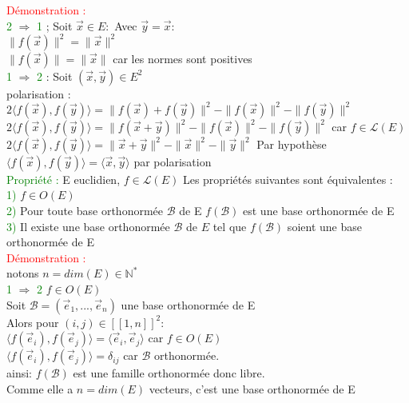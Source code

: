 \documentclass{article}
\begin{document}
\textcolor{red}{Démonstration :} \\
\textcolor{green}{2} $\Rightarrow$ \textcolor{green}{1} ; Soit $\vec x \in E :$ Avec $\vec y=\vec x :$ \\
$\| f(\vec x) \|^2=\|\vec x \|^2$ \\
$\| f(\vec x) \|=\| \vec x \|$ car les normes sont positives \\
\textcolor{green}{1} $\Rightarrow$ \textcolor{green}{2} : Soit $(\vec x, \vec y) \in E^2$ \\
polarisation : \\
$2 \langle f(\vec x), f(\vec y) \rangle = \| f(\vec x) + f(\vec y) \|^2- \| f(\vec x) \|^2 - \|f(\vec y) \|^2$ \\
$2 \langle f(\vec x), f(\vec y) \rangle =\| f(\vec x + \vec y) \|^2- \| f(\vec x) \|^2 - \|f(\vec y) \|^2$ car $f\in \mathcal L(E)$ \\
$2\langle f(\vec x),f(\vec y) \rangle = \| \vec x+ \vec y \|^2- \| \vec x \|^2 - \|\vec y \|^2$ Par hypothèse \\
 $\langle f(\vec x),f(\vec y) \rangle = \langle \vec x, \vec y \rangle$ par polarisation\\
\textcolor{green}{Propriété :} E euclidien, $f\in \mathcal L(E)$ Les propriétés suivantes sont équivalentes : \\
\textcolor{green}{1)} $f\in O(E)$ \\
\textcolor{green}{2)} Pour toute base orthonormée $\mathcal B$ de E $f(\mathcal B)$ est une base orthonormée de E \\
\textcolor{green}{3)} Il existe une base orthonormée $\mathcal B$ de $E$ tel que $f(\mathcal B)$ soient une base orthonormée de E \\
\textcolor{red}{Démonstration :} \\
notons $n=dim(E) \in \mathbb N^*$ \\
\textcolor{green}{1} $\Rightarrow$ \textcolor{green}{2} $f \in O(E)$ \\
Soit $\mathcal B=(\vec e_1,...,\vec e_n)$ une base orthonormée de E \\
Alors pour $(i,j) \in [[1,n]]^2 :$ \\
$\langle f(\vec e_i), f(\vec e_j) \rangle=\langle \vec e_i,\vec e_j \rangle$ car $f\in O(E)$ \\
$\langle f(\vec e_i), f(\vec e_j) \rangle=\delta_{ij}$ car $\mathcal B$ orthonormée. \\
ainsi: $f(\mathcal{B})$ est une famille orthonormée donc libre. \\
Comme elle a $n=dim(E)$ vecteurs, c'est une base orthonormée de E \\
\end{document}
